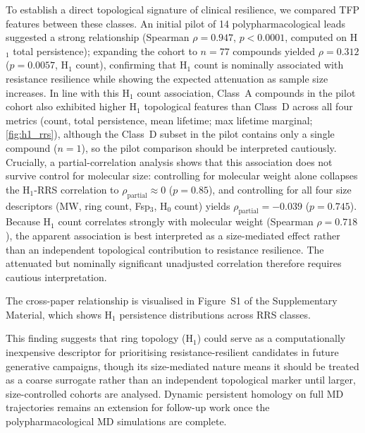 \documentclass[11pt,a4paper]{article}
\begin{document}
To establish a direct topological signature of clinical resilience, we compared TFP features between these classes. An initial pilot of 14 polypharmacological leads suggested a strong relationship (Spearman $\rho = 0.947$, $p < 0.0001$, computed on H$_1$ total persistence); expanding the cohort to $n = 77$ compounds yielded $\rho = 0.312$ ($p = 0.0057$, H$_1$ count), confirming that H$_1$ count is nominally associated with resistance resilience while showing the expected attenuation as sample size increases. In line with this H$_1$ count association, Class~A compounds in the pilot cohort also exhibited higher H$_1$ topological features than Class~D across all four metrics (count, total persistence, mean lifetime; max lifetime marginal; \cref{fig:h1_rrs}), although the Class~D subset in the pilot contains only a single compound ($n = 1$), so the pilot comparison should be interpreted cautiously. Crucially, a partial-correlation analysis shows that this association does not survive control for molecular size: controlling for molecular weight alone collapses the H$_1$-RRS correlation to $\rho_{\text{partial}} \approx 0$ ($p = 0.85$), and controlling for all four size descriptors (MW, ring count, Fsp$_3$, H$_0$ count) yields $\rho_{\text{partial}} = -0.039$ ($p = 0.745$). Because H$_1$ count correlates strongly with molecular weight (Spearman $\rho = 0.718$), the apparent association is best interpreted as a size-mediated effect rather than an independent topological contribution to resistance resilience. The attenuated but nominally significant unadjusted correlation therefore requires cautious interpretation.

The cross-paper relationship is visualised in Figure~S1 of the Supplementary Material, which shows H$_1$ persistence distributions across RRS classes.

This finding suggests that ring topology (H$_1$) could serve as a computationally inexpensive descriptor for prioritising resistance-resilient candidates in future generative campaigns, though its size-mediated nature means it should be treated as a coarse surrogate rather than an independent topological marker until larger, size-controlled cohorts are analysed. Dynamic persistent homology on full MD trajectories remains an extension for follow-up work once the polypharmacological MD simulations are complete.







\end{document}
